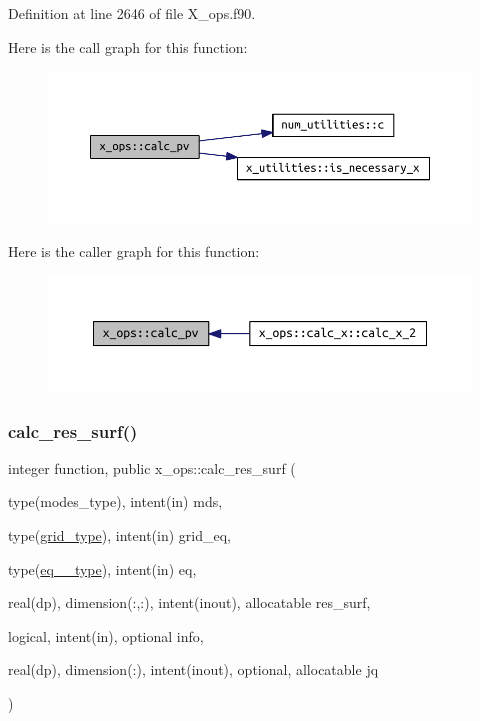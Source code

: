 Definition at line 2646 of file X\+\_\+ops.\+f90.

Here is the call graph for this function\+:\nopagebreak
\begin{figure}[H]
\begin{center}
\leavevmode
\includegraphics[width=350pt]{namespacex__ops_a51f3bf0b4c8d688ffbcc3a1adbca9762_cgraph}
\end{center}
\end{figure}
Here is the caller graph for this function\+:\nopagebreak
\begin{figure}[H]
\begin{center}
\leavevmode
\includegraphics[width=350pt]{namespacex__ops_a51f3bf0b4c8d688ffbcc3a1adbca9762_icgraph}
\end{center}
\end{figure}
\mbox{\label{namespacex__ops_a1a90026bbbeddc25e82cfdd304df251f}} 
\subsubsection{\texorpdfstring{calc\+\_\+res\+\_\+surf()}{calc\_res\_surf()}}
{\footnotesize\ttfamily integer function, public x\+\_\+ops\+::calc\+\_\+res\+\_\+surf (\begin{DoxyParamCaption}\item[{type(modes\+\_\+type), intent(in)}]{mds,  }\item[{type(\hyperlink{structgrid__vars_1_1grid__type}{grid\+\_\+type}), intent(in)}]{grid\+\_\+eq,  }\item[{type(\hyperlink{structeq__vars_1_1eq__1__type}{eq\+\_\+1\+\_\+type}), intent(in)}]{eq,  }\item[{real(dp), dimension(\+:,\+:), intent(inout), allocatable}]{res\+\_\+surf,  }\item[{logical, intent(in), optional}]{info,  }\item[{real(dp), dimension(\+:), intent(inout), optional, allocatable}]{jq }\end{DoxyParamCaption})}



